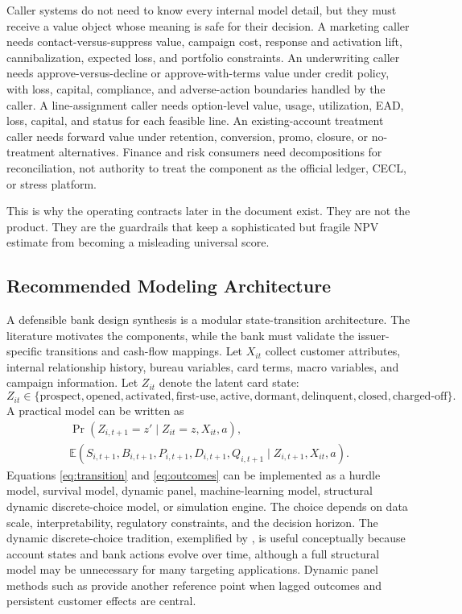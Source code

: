 \documentclass[11pt]{article}
\newcommand{\E}{\mathbb{E}}
\newcommand{\1}{\mathbf{1}}
\begin{document}
Caller systems do not need to know every internal model detail, but they must
receive a value object whose meaning is safe for their decision. A marketing
caller needs contact-versus-suppress value, campaign cost, response and
activation lift, cannibalization, expected loss, and portfolio constraints. An
underwriting caller needs approve-versus-decline or approve-with-terms value
under credit policy, with loss, capital, compliance, and adverse-action
boundaries handled by the caller. A line-assignment caller needs option-level
value, usage, utilization, EAD, loss, capital, and status for each feasible
line. An existing-account treatment caller needs forward value under retention,
conversion, promo, closure, or no-treatment alternatives. Finance and risk
consumers need decompositions for reconciliation, not authority to treat the
component as the official ledger, CECL, or stress platform.

This is why the operating contracts later in the document exist. They are not
the product. They are the guardrails that keep a sophisticated but fragile NPV
estimate from becoming a misleading universal score.

\subsection{Recommended Modeling Architecture}
\label{sec:architecture}

A defensible bank design synthesis is a modular state-transition architecture.
The literature motivates the components, while the bank must validate the
issuer-specific transitions and cash-flow mappings. Let $X_{it}$
collect customer attributes, internal relationship history, bureau variables,
card terms, macro variables, and campaign information. Let $Z_{it}$ denote the
latent card state:
\[
  Z_{it} \in
  \{\text{prospect},\text{opened},\text{activated},\text{first-use},
    \text{active},\text{dormant},\text{delinquent},\text{closed},
    \text{charged-off}\}.
\]
A practical model can be written as
\begin{align}
  \Pr(Z_{i,t+1}=z' \mid Z_{it}=z, X_{it}, a), \label{eq:transition}\\
  \E(S_{i,t+1},B_{i,t+1},P_{i,t+1},D_{i,t+1},Q_{i,t+1}
      \mid Z_{i,t+1},X_{it},a). \label{eq:outcomes}
\end{align}
Equations \eqref{eq:transition} and \eqref{eq:outcomes} can be implemented as a
hurdle model, survival model, dynamic panel, machine-learning model, structural
dynamic discrete-choice model, or simulation engine. The choice depends on data
scale, interpretability, regulatory constraints, and the decision horizon. The
dynamic discrete-choice tradition, exemplified by \citet{rust1987replacement},
is useful conceptually because account states and bank actions evolve over time,
although a full structural model may be unnecessary for many targeting
applications. Dynamic panel methods such as \citet{blundell1998initial} provide
another reference point when lagged outcomes and persistent customer effects are
central.
\end{document}
